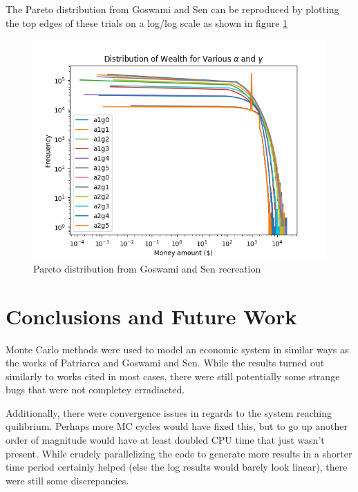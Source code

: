 \documentclass[12pt]{article} %
\begin{document}
The Pareto distribution from Goswami and Sen \cite{Goswami} can be reproduced
by plotting the top edges of these trials on a log/log scale as shown in figure
\ref{fig:paretodist}

\begin{figure}
	\includegraphics[scale=\scaleResultsC]{pareto.png}
	\centering
	\caption{Pareto distribution from Goswami and Sen recreation}
	\label{fig:paretodist}
\end{figure}
\section{Conclusions and Future Work}
Monte Carlo methods were used to model an economic system in similar ways as
the works of Patriarca\cite{Patriarca} and Goswami and Sen\cite{Goswami}. While
the results turned out similarly to works cited in most cases, there were still
potentially some strange bugs that were not completey erradiacted.

Additionally, there were convergence issues in regards to the system reaching
quilibrium. Perhaps more MC cycles would have fixed this, but to go up another
order of magnitude would have at least doubled CPU time that just wasn't
present. While crudely parallelizing the code to generate more results in a
shorter time period certainly helped (else the log results would barely look
linear), there were still some discrepancies.
\end{document}
